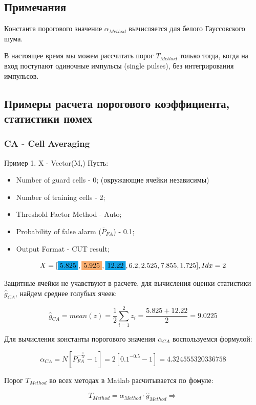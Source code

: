 \documentclass[a4paper,11pt]{article}
\begin{document}
 	\subsection{Примечания}
 		Константа порогового значение $\alpha_{Method}$ вычисляется для белого Гауссовского шума.
 		
 		В настоящее время мы можем рассчитать порог $T_{Method}$ только тогда, когда на вход поступают одиночные импульсы (single pulses), без интегрирования импульсов.
 	
	\subsection{Примеры расчета порогового коэффициента, статистики помех}
		\subsubsection{CA - Cell Averaging}
			Пример 1. X - Vector(M,)
			Пусть:
			
			\begin{itemize}
				\item Number of guard cells - 0; (окружающие ячейки независимы)
				\item Number of training cells - 2;
				\item Threshold Factor Method - Auto;
				\item Probability of false alarm ($\overline{P}_{FA}$) - 0.1;
				\item Output Format - CUT result;
			\end{itemize}
			 
			$$X = [\colorbox{Cerulean}{5.825}, \colorbox{Apricot}{5.925}, \colorbox{Cerulean}{12.22}, 6.2, 2.525, 7.855, 1.725], Idx = 2$$
			
			Защитные ячейки не учавствуют в расчете, для вычисления оценки статистики $\widehat{g}_{CA}$, найдем среднее голубых ячеек:
			
			$$ \widehat{g}_{CA} = mean(z) = \frac{1}{2}\sum_{i = 1}^{2}z_{i} = \frac{5.825 + 12.22}{2} = 9.0225$$
			
			Для вычисления константы порогового значения $\alpha_{CA}$ воспользуемся формулой:
			
			$$ \alpha_{CA} = N \left[\overline{P}_{FA}^{-\frac{1}{N}} - 1\right] = 2 \left[0.1^{-0.5} - 1\right] = 4.324555320336758$$
			
			Порог $T_{Method}$ во всех методах в Matlab расчитывается по фомуле:
			
			$$ T_{Method} = \alpha_{Method}\cdot \widehat{g}_{Method} \Rightarrow $$
			
\end{document}
